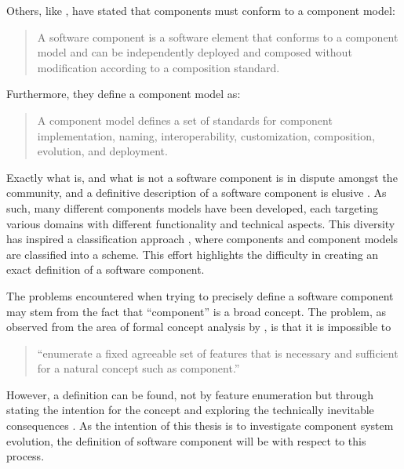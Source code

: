 Others, like \citep{heineman2001component}, have stated that components must conform to a component model: 
\begin{quotation}
A software component is a software element that conforms to a component model and can be independently deployed and composed without modification according to a composition standard.
\end{quotation}

Furthermore, they define a component model as:
\begin{quotation}
A component model defines a set of standards for component implementation, naming, interoperability, customization, composition, evolution, and deployment.
\end{quotation}

Exactly what is, and what is not a software component is in dispute amongst the community,
and a definitive description of a software component is elusive \citep{vasa2007patterns}.
As such, many different components models have been developed, each targeting various domains with different functionality and technical aspects.
This diversity has inspired a classification approach \citep{Crnkovic2011}, where components and component models are classified into a scheme.
This effort highlights the difficulty in creating an exact definition of a software component. 

The problems encountered when trying to precisely define a software component may stem from the fact that ``component'' is a broad concept.
The problem, as observed from the area of formal concept analysis \citep{Ganter1999} by \citep{Szyperski2002}, is that it is impossible to

\begin{quotation} 
``enumerate a fixed agreeable set of features that is necessary and sufficient for a natural concept such as component.''
\end{quotation}

However, a definition can be found, not by feature enumeration but through stating the intention for the concept
and exploring the technically inevitable consequences \citep{Szyperski2002}. 
As the intention of this thesis is to investigate component system evolution,
the definition of software component will be with respect to this process.

